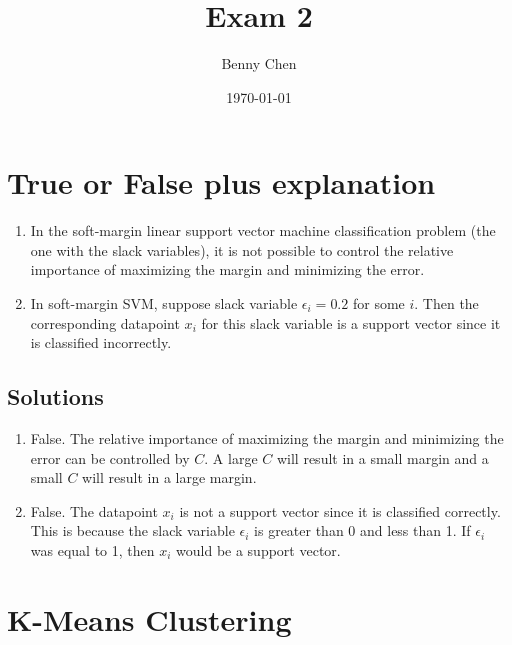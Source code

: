 \documentclass{article}
\title{Exam 2}
\author{Benny Chen}
\date{\today}
\begin{document}
\maketitle

\section{True or False plus explanation}

\begin{enumerate}
    \item In the soft-margin linear support vector machine classification problem (the one with the slack variables), it is not possible to control the relative importance of maximizing the margin and minimizing the error.
    \item In soft-margin SVM, suppose slack variable $\epsilon_i = 0.2$ for some $i$. Then the corresponding
    datapoint $x_i$ for this slack variable is a support vector since it is classified incorrectly.
\end{enumerate}

\subsection*{Solutions}

\begin{enumerate}
    \item False. The relative importance of maximizing the margin and minimizing the error can be controlled by $C$. A large $C$ will result in a small margin and a small $C$ will result in a large margin.
    \item False. The datapoint $x_i$ is not a support vector since it is classified correctly. This is because the slack variable $\epsilon_i$ is greater than 0 and less than 1. If $\epsilon_i$ was equal to 1, then $x_i$ would be a support vector.
\end{enumerate}

\newpage

\section{K-Means Clustering}
\end{document}
